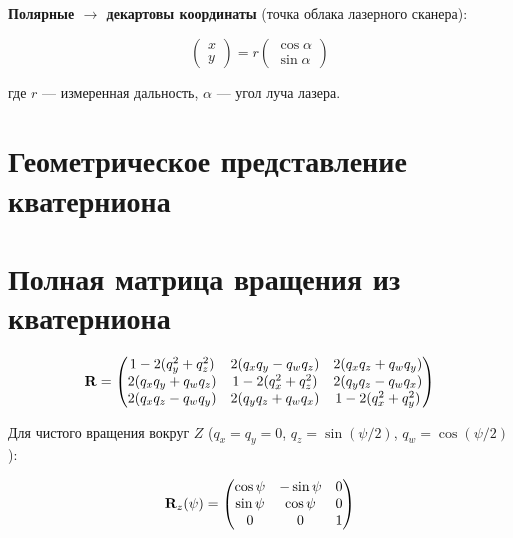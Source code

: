 \textbf{Полярные $\to$ декартовы координаты} (точка облака лазерного сканера):

\begin{equation}
  \begin{pmatrix} x \\ y \end{pmatrix}
  = r \begin{pmatrix} \cos\alpha \\ \sin\alpha \end{pmatrix}
  \label{eq:polar_to_cart}
\end{equation}

где $r$ --- измеренная дальность, $\alpha$ --- угол луча лазера.

\section{Геометрическое представление кватерниона}

\begin{center}
\end{center}

\section{Полная матрица вращения из кватерниона}

\begin{equation}
  \mathbf{R} = \begin{pmatrix}
    1-2(q_y^2+q_z^2) & 2(q_xq_y-q_wq_z) & 2(q_xq_z+q_wq_y) \\
    2(q_xq_y+q_wq_z) & 1-2(q_x^2+q_z^2) & 2(q_yq_z-q_wq_x) \\
    2(q_xq_z-q_wq_y) & 2(q_yq_z+q_wq_x) & 1-2(q_x^2+q_y^2)
  \end{pmatrix}
  \label{eq:rot_matrix_full}
\end{equation}

Для чистого вращения вокруг $Z$ ($q_x = q_y = 0$,
$q_z = \sin(\psi/2)$, $q_w = \cos(\psi/2)$):

\begin{equation}
  \mathbf{R}_z(\psi) = \begin{pmatrix}
    \cos\psi & -\sin\psi & 0 \\
    \sin\psi &  \cos\psi & 0 \\
    0 & 0 & 1
  \end{pmatrix}
  \label{eq:Rz_yaw}
\end{equation}
